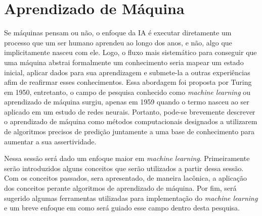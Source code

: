 \section{Aprendizado de Máquina}
Se máquinas pensam ou não, o enfoque da IA é executar diretamente um processo que um ser humano aprendeu ao longo dos anos, e não, algo que implicitamente nasceu com ele. Logo, o fluxo mais sistemático para conseguir que uma máquina abstrai formalmente um conhecimento seria mapear um estado inicial, aplicar dados para sua aprendizagem e submete-la a outras experiências afim de reafirmar esses conhecimentos. Essa abordagem foi proposta por Turing em 1950, entretanto, o campo de pesquisa conhecido como \textit{machine learning} ou aprendizado de máquina surgiu, apenas em 1959 quando o termo nasceu ao ser aplicado em um estudo de redes neurais. Portanto, pode-se brevemente descrever o aprendizado de máquina como métodos computacionais designados a utilizarem de algoritmos precisos de predição juntamente a uma base de conhecimento para aumentar a sua assertividade\cite[1]{turing1950, samuel1959some, mohri2012foundations}.

Nessa sessão será dado um enfoque maior em \textit{machine learning}. Primeiramente serão introduzidos alguns conceitos que serão utilizados a partir dessa sessão. Com os conceitos passados, sera apresentado, de maneira lacônica, a aplicação dos conceitos perante algoritmos de aprendizado de máquina. Por fim, será sugerido algumas ferramentas utilizadas para implementação do \textit{machine learning} e um breve enfoque em como será guiado esse campo dentro desta pesquisa.



